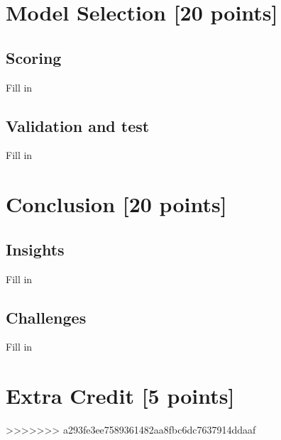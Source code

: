 \newpage

\section{Model Selection [20 points]}
\subsection{Scoring}
Fill in

\subsection{Validation and test}
Fill in

\newpage

\section{Conclusion [20 points]}
\subsection{Insights}
Fill in

\subsection{Challenges}
Fill in
\newpage

\section{Extra Credit [5 points]}



>>>>>>> a293fe3ee7589361482aa8fbc6dc7637914ddaaf
